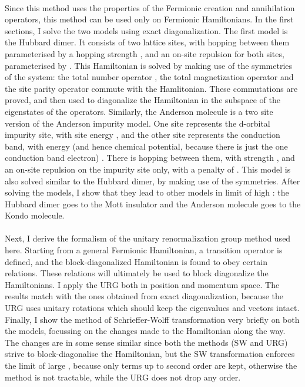 \documentclass[12pt]{article}
\begin{document}
\paragraph{}
Since this method uses the properties of the Fermionic creation and annihilation operators, this method can be used only on Fermionic Hamiltonians. In the first sections, I solve the two models using exact diagonalization. The first model is the Hubbard dimer. It consists of two lattice sites, with hopping between them parameterised by a hopping strength , and an on-site repulsion for both sites, parameterised by . This Hamiltonian is solved by making use of the symmetries of the system: the total number operator , the total magnetization operator  and the site parity operator  commute with the Hamlitonian. These commutations are proved, and then used to diagonalize the Hamiltonian in the subspace of the eigenstates of the operators. Similarly, the Anderson molecule is a two site version of the Anderson impurity model. One site represents the d-orbital impurity site, with site energy , and the other site represents the conduction band, with energy (and hence chemical potential, because there is just the one conduction band electron) . There is hopping between them, with strength , and an on-site repulsion on the impurity site only, with a penalty of . This model is also solved similar to the Hubbard dimer, by making use of the symmetries. After solving the models, I show that they lead to other models in limit of high : the Hubbard dimer goes to the Mott insulator and the Anderson molecule goes to the Kondo molecule.

\paragraph{}
Next, I derive the formalism of the unitary renormalization group method used here. Starting from a general Fermionic Hamiltonian, a transition operator \il{\eta} is defined, and the block-diagonalized Hamiltonian is found to obey certain relations. These relations will ultimately be used to block diagonalize the Hamiltonians. I apply the URG both in position and momentum space. The results match with the ones obtained from exact diagonalization, because the URG uses unitary rotations which should keep the eigenvalues and vectors intact. Finally, I show the method of Schrieffer-Wolff transformation very briefly on both the models, focussing on the changes made to the Hamiltonian along the way. The changes are in some sense similar since both the methods (SW and URG) strive to block-diagonalise the Hamiltonian, but the SW transformation enforces the limit of large , because only terms up to second order are kept, otherwise the method is not tractable, while the URG does not drop any order.
\end{document}
